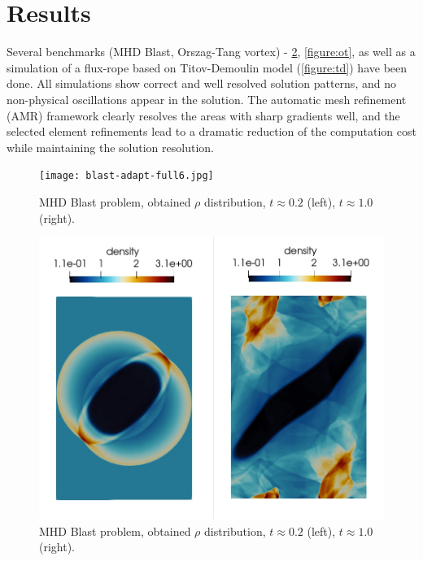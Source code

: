 \documentclass[journal,transmag]{IEEEtran}
\begin{document}
\section{Results}
Several benchmarks (MHD Blast, Orszag-Tang vortex) - \ref{figure:blastFinal}, \ref{figure:ot}, as well as a simulation of a flux-rope based on Titov-Demoulin model (\ref{figure:td}) have been done.
All simulations show correct and well resolved solution patterns, and no non-physical oscillations appear in the solution. The automatic mesh refinement (AMR) framework clearly resolves the areas with sharp gradients well, and the selected element refinements lead to a dramatic reduction of the computation cost while maintaining the solution resolution.
\begin{figure}
	\begin{center}
		\texttt{[image: blast-adapt-full6.jpg]}
		\caption{MHD Blast problem, obtained $\rho$ distribution, $t \approx 0.2$ (left), $t \approx 1.0$ (right).}
		\label{figure:blastFinal}
	\end{center}
\end{figure}
\begin{figure}
	\begin{center}
		\includegraphics[width=1.0\columnwidth]{ref-result.jpg}
	\caption{MHD Blast problem, obtained $\rho$ distribution, $t \approx 0.2$ (left), $t \approx 1.0$ (right).}
	\label{figure:blastFinal}
	\end{center}
\end{figure}
\end{document}
